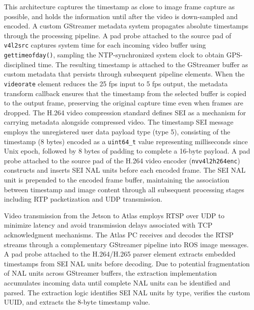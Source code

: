 This architecture captures the timestamp as close to image frame capture as possible, and holds the information until after the video is down-sampled and encoded.
A custom GStreamer metadata system propagates absolute timestamps through the processing pipeline. A pad probe attached to the source pad of \texttt{v4l2src} captures system time for each incoming video buffer using \texttt{gettimeofday()}, sampling the \ac{NTP}-synchronized system clock to obtain GPS-disciplined time. The resulting timestamp is attached to the GStreamer buffer as custom metadata that persists through subsequent pipeline elements. When the \texttt{videorate} element reduces the 25 fps input to 5 fps output, the metadata transform callback ensures that the timestamp from the selected buffer is copied to the output frame, preserving the original capture time even when frames are dropped.
The H.264 video compression standard defines \ac{SEI} as a mechanism for carrying metadata alongside compressed video. 
The timestamp \ac{SEI} message employs the unregistered user data payload type (type 5), consisting of the timestamp (8 bytes) encoded as a \texttt{uint64\_t} value representing milliseconds since Unix epoch, followed by 8 bytes of padding to complete a 16-byte payload. 
A pad probe attached to the source pad of the H.264 video encoder (\texttt{nvv4l2h264enc}) constructs and inserts \ac{SEI} \ac{NAL} units before each encoded frame.  
The \ac{SEI} \ac{NAL} unit is prepended to the encoded frame buffer, maintaining the association between timestamp and image content through all subsequent processing stages including \ac{RTP} packetization and \ac{UDP} transmission.

Video transmission from the Jetson to Atlas employs \ac{RTSP} over \ac{UDP} to minimize latency and avoid transmission delays associated with TCP acknowledgment mechanisms. The Atlas PC receives and decodes the \ac{RTSP} streams through a complementary GStreamer pipeline into ROS image messages. A pad probe attached to the H.264/H.265 parser element extracts embedded timestamps from \ac{SEI} \ac{NAL} units before decoding. Due to potential fragmentation of \ac{NAL} units across GStreamer buffers, the extraction implementation accumulates incoming data until complete \ac{NAL} units can be identified and parsed. The extraction logic identifies \ac{SEI} \ac{NAL} units by type, verifies the custom UUID, and extracts the 8-byte timestamp value.

